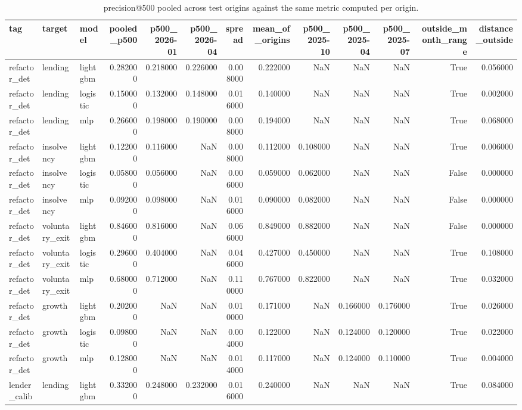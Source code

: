 \begin{table}
\caption{precision@500 pooled across test origins against the same metric computed per origin.}
\label{tab:17_per_origin_spread}
\begin{tabular}{lllrrrrrrrrrr}
\toprule
tag & target & model & pooled_p500 & p500_2026-01 & p500_2026-04 & spread & mean_of_origins & p500_2025-10 & p500_2025-04 & p500_2025-07 & outside_month_range & distance_outside \\
\midrule
refactor_det & lending & lightgbm & 0.282000 & 0.218000 & 0.226000 & 0.008000 & 0.222000 & NaN & NaN & NaN & True & 0.056000 \\
refactor_det & lending & logistic & 0.150000 & 0.132000 & 0.148000 & 0.016000 & 0.140000 & NaN & NaN & NaN & True & 0.002000 \\
refactor_det & lending & mlp & 0.266000 & 0.198000 & 0.190000 & 0.008000 & 0.194000 & NaN & NaN & NaN & True & 0.068000 \\
refactor_det & insolvency & lightgbm & 0.122000 & 0.116000 & NaN & 0.008000 & 0.112000 & 0.108000 & NaN & NaN & True & 0.006000 \\
refactor_det & insolvency & logistic & 0.058000 & 0.056000 & NaN & 0.006000 & 0.059000 & 0.062000 & NaN & NaN & False & 0.000000 \\
refactor_det & insolvency & mlp & 0.092000 & 0.098000 & NaN & 0.016000 & 0.090000 & 0.082000 & NaN & NaN & False & 0.000000 \\
refactor_det & voluntary_exit & lightgbm & 0.846000 & 0.816000 & NaN & 0.066000 & 0.849000 & 0.882000 & NaN & NaN & False & 0.000000 \\
refactor_det & voluntary_exit & logistic & 0.296000 & 0.404000 & NaN & 0.046000 & 0.427000 & 0.450000 & NaN & NaN & True & 0.108000 \\
refactor_det & voluntary_exit & mlp & 0.680000 & 0.712000 & NaN & 0.110000 & 0.767000 & 0.822000 & NaN & NaN & True & 0.032000 \\
refactor_det & growth & lightgbm & 0.202000 & NaN & NaN & 0.010000 & 0.171000 & NaN & 0.166000 & 0.176000 & True & 0.026000 \\
refactor_det & growth & logistic & 0.098000 & NaN & NaN & 0.004000 & 0.122000 & NaN & 0.124000 & 0.120000 & True & 0.022000 \\
refactor_det & growth & mlp & 0.128000 & NaN & NaN & 0.014000 & 0.117000 & NaN & 0.124000 & 0.110000 & True & 0.004000 \\
lender_calib & lending & lightgbm & 0.332000 & 0.248000 & 0.232000 & 0.016000 & 0.240000 & NaN & NaN & NaN & True & 0.084000 \\

\end{tabular}
\end{table}
